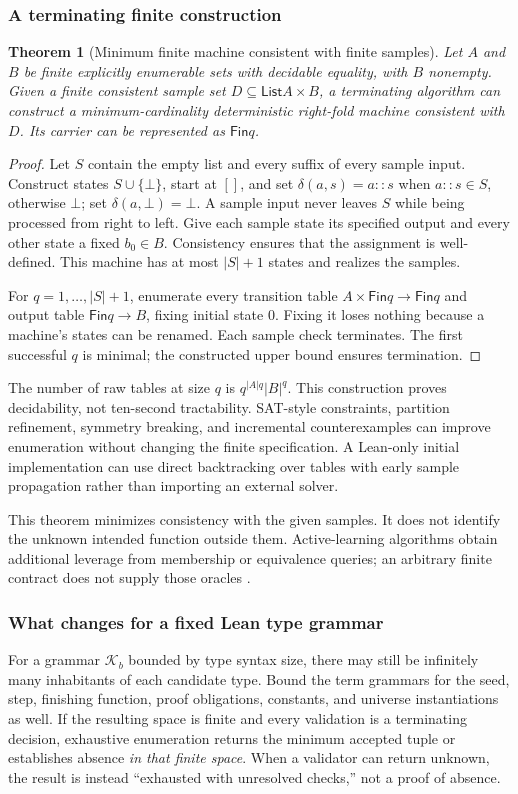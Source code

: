 \documentclass[11pt,a4paper]{article}
\newtheorem{theorem}{Theorem}[section]
\theoremstyle{definition}
\theoremstyle{remark}
\newcommand{\List}{\mathsf{List}}
\newcommand{\Fin}{\mathsf{Fin}}
\begin{document}
\subsubsection*{A terminating finite construction}
\begin{theorem}[Minimum finite machine consistent with finite samples]
Let $A$ and $B$ be finite explicitly enumerable sets with decidable equality,
with $B$ nonempty. Given a finite consistent sample set
$D\subseteq\List A\times B$, a terminating algorithm can construct a
minimum-cardinality deterministic right-fold machine consistent with $D$.
Its carrier can be represented as $\Fin q$.
\end{theorem}
\begin{proof}
Let $S$ contain the empty list and every suffix of every sample input. Construct
states $S\cup\{\bot\}$, start at $[]$, and set
$\delta(a,s)=a::s$ when $a::s\in S$, otherwise $\bot$; set
$\delta(a,\bot)=\bot$. A sample input never leaves $S$ while being processed
from right to left. Give each sample state its specified output and every
other state a fixed $b_0\in B$. Consistency ensures that the assignment is
well-defined. This machine has at most $|S|+1$ states and realizes the samples.

For $q=1,\ldots,|S|+1$, enumerate every transition table
$A\times\Fin q\to\Fin q$ and output table $\Fin q\to B$, fixing initial state
$0$. Fixing it loses nothing because a machine's states can be renamed. Each
sample check terminates. The first successful $q$ is minimal; the constructed
upper bound ensures termination.
\end{proof}

The number of raw tables at size $q$ is
$q^{|A|q}|B|^q$. This construction proves decidability, not ten-second
tractability. SAT-style constraints, partition refinement, symmetry breaking,
and incremental counterexamples can improve enumeration without changing the
finite specification. A Lean-only initial implementation can use direct
backtracking over tables with early sample propagation rather than importing
an external solver.

This theorem minimizes consistency with the given samples. It does not identify
the unknown intended function outside them. Active-learning algorithms obtain
additional leverage from membership or equivalence queries; an arbitrary finite
contract does not supply those oracles \cite{angluin}.

\subsubsection*{What changes for a fixed Lean type grammar}
For a grammar $\mathcal K_b$ bounded by type syntax size, there may still be
infinitely many inhabitants of each candidate type. Bound the term grammars
for the seed, step, finishing function, proof obligations, constants, and
universe instantiations as well. If the resulting space is finite and every
validation is a terminating decision, exhaustive enumeration returns the
minimum accepted tuple or establishes absence \emph{in that finite space}.
When a validator can return unknown, the result is instead ``exhausted with
unresolved checks,'' not a proof of absence.
\end{document}
